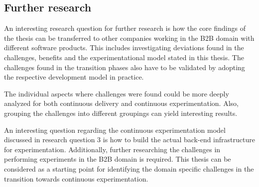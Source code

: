 \documentclass[english]{tktltiki2}
\theoremstyle{definition}
\theoremstyle{remark}
\begin{document}
\subsection{Further research}
An interesting research question for further research is how the core findings of the thesis can be transferred to other companies working in the B2B domain with different software products. This includes investigating deviations found in the challenges, benefits and the experimentational model stated in this thesis. The challenges found in the transition phases also have to be validated by adopting the respective development model in practice. 

The individual aspects where challenges were found could be more deeply analyzed for both continuous delivery and continuous experimentation. Also, grouping the challenges into different groupings can yield interesting results.

An interesting question regarding the continuous experimentation model discussed in research question 3 is how to build the actual back-end infrastructure for experimentation. Additionally, further researching the challenges in performing experiments in the B2B domain is required. This thesis can be considered as a starting point for identifying the domain specific challenges in the transition towards continuous experimentation.












\newpage
\end{document}

